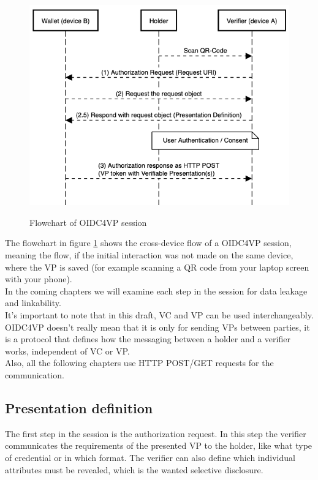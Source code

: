 \documentclass[
	a4paper               %
	,BCOR=0mm            %
	,bibliography=totoc   %
	,listof=totoc         %
	,monolingual
	,twoside=false
]{bfhthesis}              %
\begin{document}
\begin{figure}[h]
	\centering
	\includegraphics[width=12cm]{./img/oidc4vpflow.png}
	\label{fig:flowvp}
	\caption{Flowchart of OIDC4VP session}
\end{figure}

The flowchart in figure \ref{fig:flowvp} shows the cross-device flow of a OIDC4VP session, meaning the flow, if the initial interaction was not made on the same device, where the VP is saved (for example scanning a QR code from your laptop screen with your phone).\\

In the coming chapters we will examine each step in the session for data leakage and linkability.\\

It's important to note that in this draft, VC and VP can be used interchangeably.
OIDC4VP doesn't really mean that it is only for sending VPs between parties, it is a protocol that defines how the messaging between a holder and a verifier works, independent of VC or VP.\\

\noindent
Also, all the following chapters use HTTP POST/GET requests for the communication.
\newpage
\subsection{Presentation definition}
\label{subsec:presdef}
The first step in the session is the authorization request. 
In this step the verifier communicates the requirements of the presented VP to the holder, like what type of credential or in which format.
The verifier can also define which individual attributes must be revealed, which is the wanted selective disclosure.
\end{document}
